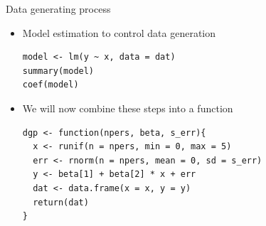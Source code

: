 \documentclass[aspectratio=169]{beamer}
\begin{document}
\begin{frame}[fragile]{Data generating process}
  \begin{itemize}
    \item Model estimation to control data generation
\begin{lstlisting}
model <- lm(y ~ x, data = dat)
summary(model)
coef(model)
\end{lstlisting}
    \item We will now combine these steps into a function
\begin{lstlisting}
dgp <- function(npers, beta, s_err){
  x <- runif(n = npers, min = 0, max = 5)
  err <- rnorm(n = npers, mean = 0, sd = s_err)
  y <- beta[1] + beta[2] * x + err
  dat <- data.frame(x = x, y = y)
  return(dat)
}
\end{lstlisting}
  \end{itemize}
\end{frame}
\end{document}
